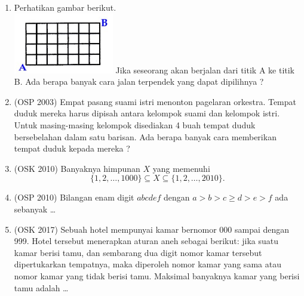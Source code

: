 \documentclass[11pt]{scrartcl}
\begin{document}
\begin{enumerate}
    \item Perhatikan gambar berikut.\\
    \includegraphics[scale=1.2]{kombin.PNG}
    Jika seseorang akan berjalan dari titik A ke titik B. Ada berapa banyak cara jalan terpendek 
yang dapat dipilihnya ?
    
    \item (OSP 2003) Empat pasang suami istri menonton pagelaran orkestra. Tempat duduk mereka harus 
dipisah antara kelompok suami dan kelompok istri. Untuk masing-masing kelompok disediakan 4
buah tempat duduk bersebelahan dalam satu barisan. Ada berapa banyak cara memberikan 
tempat duduk kepada mereka ?

    \item (OSK 2010) Banyaknya himpunan $X$ yang memenuhi 
$$\{1,2,\dots,1000\} \subseteq X \subseteq \{1,2,\dots,2010\}.$$

    \item (OSP 2010) Bilangan enam digit $abcdef$ dengan $a > b > c \ge d > e > f$ ada sebanyak \dots
    
    \item (OSK 2017)
	Sebuah hotel mempunyai kamar bernomor 000 sampai dengan 999. Hotel tersebut menerapkan
aturan aneh sebagai berikut: jika suatu kamar berisi tamu, dan sembarang dua digit nomor kamar
tersebut dipertukarkan tempatnya, maka diperoleh nomor kamar yang sama atau nomor kamar
yang tidak berisi tamu. Maksimal banyaknya kamar yang berisi tamu adalah \dots
\end{enumerate}
\end{document}

